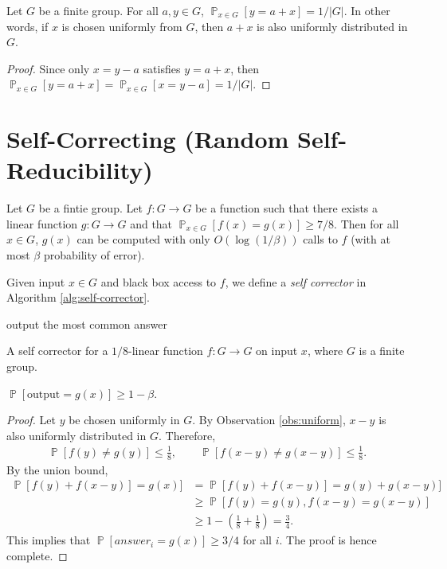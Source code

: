 \documentclass[letterpaper, reqno,11pt]{article}
\newcommand{\PP}{\mathop{{}\mathbb{P}}}
\begin{document}
\begin{observation} \label{obs:uniform}
  Let $G$ be a finite group. For all $a, y \in G$, $\PP_{x \in G}[y = a + x] = 1/|G|$. In other words, if $x$ is chosen uniformly from $G$, then $a + x$ is also uniformly distributed in $G$.
\end{observation}

\begin{proof}
  Since only $x = y - a$ satisfies $y = a + x$, then $\PP_{x \in G}[y = a + x] = \PP_{x \in G}[x = y - a] = 1/|G|$.
\end{proof}

\section{Self-Correcting (Random Self-Reducibility)}

\begin{theorem}
  Let $G$ be a fintie group. Let $f : G \to G$ be a function such that there exists a linear function $g : G \to G$ and that $\PP_{x \in G}[f(x) = g(x)] \geq 7/8$. Then for all $x \in G$, $g(x)$ can be computed with only $O(\log (1/\beta))$ calls to $f$ (with at most $\beta$ probability of error).
\end{theorem}

Given input $x \in G$ and black box access to $f$, we define a \emph{self corrector} in Algorithm \ref{alg:self-corrector}.

\begin{algorithm}
  output the most common answer
  \caption{A self corrector for a $1/8$-linear function $f : G \to G$ on input $x$, where $G$ is a finite group.}
  \label{alg:self-corrector}
\end{algorithm}

\begin{proposition}
  $\PP[\text{output} = g(x)] \geq 1 - \beta$.
\end{proposition}

\begin{proof}
  Let $y$ be chosen uniformly in $G$. By Observation \ref{obs:uniform}, $x - y$ is also uniformly distributed in $G$. Therefore,
  \begin{gather*}
    \PP[f(y) \neq g(y)] \leq \frac{1}{8}, \qquad \PP[f(x - y) \neq g(x - y)] \leq \frac{1}{8}.
  \end{gather*}
  By the union bound,
  \begin{align*}
    \PP[f(y) + f(x - y)] = g(x)] &= \PP[f(y) + f(x - y)] = g(y) + g(x - y)] \\
    &\geq \PP[f(y) = g(y), f(x - y) = g(x - y)] \\
    &\geq 1 - \left(\frac{1}{8} + \frac{1}{8}\right) = \frac{3}{4}.
  \end{align*}
  This implies that $\PP[\textit{answer}_i = g(x)] \geq 3/4$ for all $i$. The proof is hence complete.
\end{proof}
\end{document}
